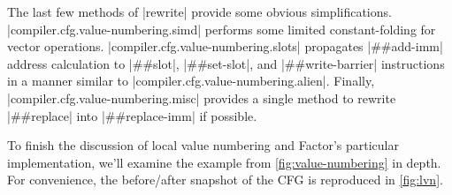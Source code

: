 The last few methods of \factor|rewrite| provide some obvious simplifications.
\factor|compiler.cfg.value-numbering.simd| performs some limited
constant-folding for vector operations.
\factor|compiler.cfg.value-numbering.slots| propagates \factor|##add-imm|
address calculation to \factor|##slot|, \factor|##set-slot|, and
\factor|##write-barrier| instructions in a manner similar to
\factor|compiler.cfg.value-numbering.alien|.  Finally,
\factor|compiler.cfg.value-numbering.misc| provides a single method to rewrite
\factor|##replace| into \factor|##replace-imm| if possible.




To finish the discussion of local value numbering and Factor's particular
implementation, we'll examine the example from \vref{fig:value-numbering} in
depth.  For convenience, the before/after snapshot of the \gls{CFG} is
reproduced in \vref{fig:lvn}.

